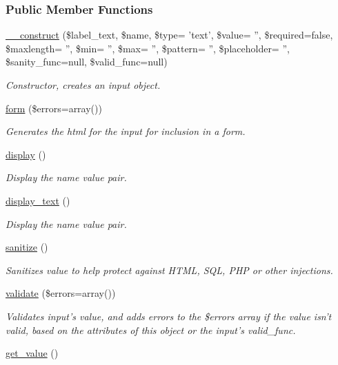 \subsubsection*{Public Member Functions}
\begin{DoxyCompactItemize}
\item 
\hyperlink{classinput_a0dc76f4753726b777552524a8847f51f}{\-\_\-\-\_\-construct} (\$label\-\_\-text, \$name, \$type= 'text', \$value= '', \$required=false, \$maxlength= '', \$min= '', \$max= '', \$pattern= '', \$placeholder= '', \$sanity\-\_\-func=null, \$valid\-\_\-func=null)
\begin{DoxyCompactList}\small\item\em Constructor, creates an input object. \end{DoxyCompactList}\item 
\hyperlink{classinput_a83b663057f1d0f61768bc12c5a55f25c}{form} (\$errors=array())
\begin{DoxyCompactList}\small\item\em Generates the html for the input for inclusion in a form. \end{DoxyCompactList}\item 
\hyperlink{classinput_a993053ef011cade1db0ceaccb1f4da53}{display} ()
\begin{DoxyCompactList}\small\item\em Display the name value pair. \end{DoxyCompactList}\item 
\hyperlink{classinput_a344058a20cc48c9fe170b3b59905a53b}{display\-\_\-text} ()
\begin{DoxyCompactList}\small\item\em Display the name value pair. \end{DoxyCompactList}\item 
\hyperlink{classinput_ab8456d2b5a929801af6fe0b36afd458c}{sanitize} ()
\begin{DoxyCompactList}\small\item\em Sanitizes value to help protect against H\-T\-M\-L, S\-Q\-L, P\-H\-P or other injections. \end{DoxyCompactList}\item 
\hyperlink{classinput_aaf4ed91e7abbc20e2396a4b07dbd031a}{validate} (\$errors=array())
\begin{DoxyCompactList}\small\item\em Validates input's value, and adds errors to the \$errors array if the value isn't valid, based on the attributes of this object or the input's valid\-\_\-func. \end{DoxyCompactList}\item 
\hypertarget{classinput_a1b3bcdbb596a1154a944a169ac67f547}{\hyperlink{classinput_a1b3bcdbb596a1154a944a169ac67f547}{get\-\_\-value} ()}\label{classinput_a1b3bcdbb596a1154a944a169ac67f547}


\end{DoxyCompactItemize}
